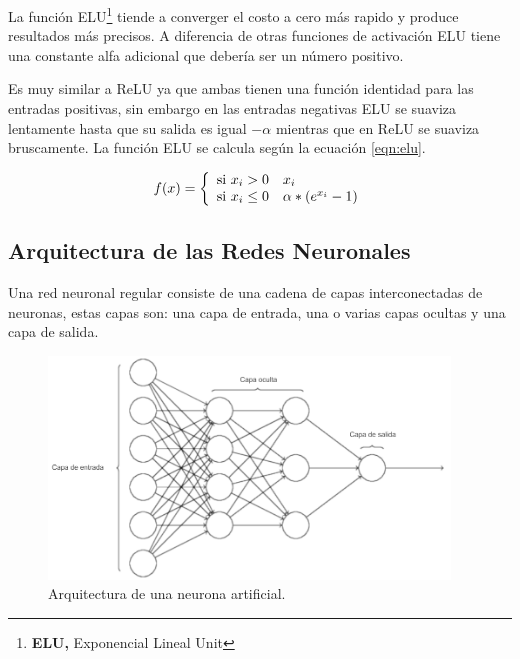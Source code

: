 La funci\'{o}n ELU\footnote{\textbf{ELU, }Exponencial Lineal Unit} tiende a converger el costo a cero m\'{a}s rapido y produce resultados m\'{a}s precisos. A diferencia de otras funciones de activaci\'{o}n ELU tiene una constante alfa adicional que deber\'{i}a ser un n\'{u}mero positivo.

\vspace{5mm} %

Es muy similar a ReLU ya que ambas tienen una funci\'{o}n identidad para las entradas positivas, sin embargo en las entradas negativas ELU se suaviza lentamente hasta que su salida es igual $-\alpha$ mientras que en ReLU se suaviza bruscamente. La funci\'{o}n ELU se calcula seg\'{u}n la ecuaci\'{o}n \ref{eqn:elu}.

\begin{equation}
f(x) = \left\lbrace
\begin{array}{ll}
\textup{si } x_{i}>0 & x_{i}\\
\textup{si } x_{i} \leq 0 & \alpha *( e^{x_{i}}-1)
\end{array}
\right.
\label{eqn:elu}
\end{equation}

\subsection{Arquitectura de las Redes Neuronales}

Una red neuronal regular consiste de una cadena de capas interconectadas de neuronas, estas capas son: una capa de entrada, una o varias capas ocultas y una capa de salida. 

\begin{figure}[h!]
  \begin{center}	\includegraphics[width=0.95\textwidth]{imagenes/Cap4/arquitectura}
  \caption{Arquitectura de una neurona artificial.}
  \label{fig:arquitectura}
  \end{center}
\end{figure}

